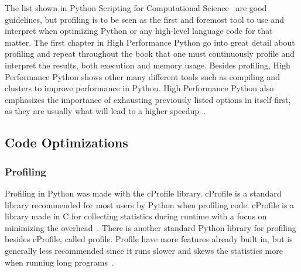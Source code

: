 \documentclass[12pt, a4paper]{article}
\begin{document}
\begin{itemize}

\end{itemize}

The list shown in Python Scripting for Computational Science~\cite{pythonBook} are good guidelines, but profiling is to be seen as the first and foremost tool to use and interpret when optimizing Python or any high-level language code for that matter.
The first chapter in High Performance Python go into great detail about profiling and repeat throughout the book that one must continuously profile and interpret the results, both execution and memory usage.
Besides profiling, High Performance Python shows other many different tools such as compiling and clusters to improve performance in Python.
High Performance Python also emphasizes the importance of exhausting previously listed options in itself first, as they are usually what will lead to a higher speedup~\cite{oreillyCh10}.

\subsection{Code Optimizations}

\subsubsection{Profiling}

Profiling in Python was made with the cProfile library.
cProfile is a standard library recommended for most users by Python when profiling code.
cProfile is a library made in C for collecting statistics during runtime with a focus on minimizing the overhead~\cite{Py:cProfile}.
There is another standard Python library for profiling besides cProfile, called profile.
Profile have more features already built in, but is generally less recommended since it runs slower and skews the statistics more when running long programs~\cite{Py:cProfile}.
\end{document}
